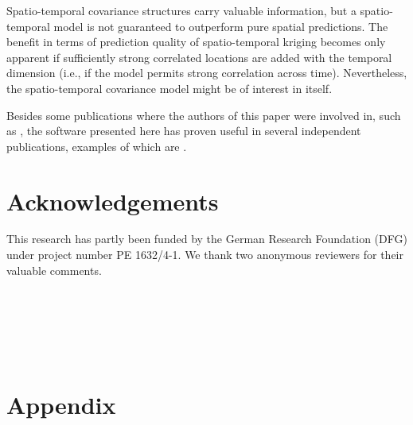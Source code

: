 Spatio-temporal covariance structures carry valuable information, but a spatio-temporal model is not guaranteed to outperform pure spatial predictions. The benefit in terms of prediction quality of spatio-temporal kriging becomes only apparent if sufficiently strong correlated locations are added with the temporal dimension (i.e., if the model permits strong correlation across time). Nevertheless, the spatio-temporal covariance model might be of interest in itself. 

Besides some publications where the authors of this paper were involved in, such as \cite{Kilibarda2014}, the software presented here has proven useful in several independent publications, examples of which are \citep{marek, biondi, hu, yoon}.

\section*{Acknowledgements}
This research has partly been funded by the German Research Foundation (DFG) under project number PE 1632/4-1. We thank two anonymous reviewers for their valuable comments.



\pagebreak

\address{Benedikt Gr{\"a}ler\\
  Institute for Geoinformatics, University of M{\"u}nster\\
  Heisenbergstr. 2, 48149 M{\"u}nster\\
  Germany}\\

\address{Edzer Pebesma\\
  Institute for Geoinformatics, University of M{\"u}nster\\
  Heisenbergstr. 2, 48149 M{\"u}nster\\
  Germany}\\

\address{Gerard Heuvelink\\
  Department of Environmental Sciences, Wageningen University\\
  street, code, city\\
  The Netherlands}\\

\section*{Appendix}
